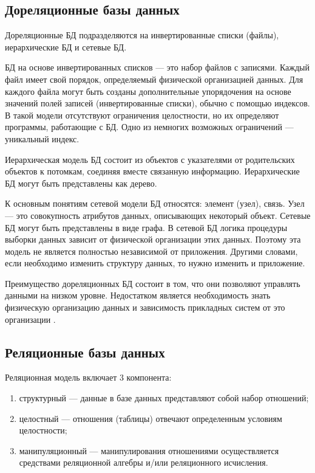 \subsection{Дореляционные базы данных}

Дореляционные БД подразделяются на инвертированные списки (файлы), иерархические БД и сетевые БД.

БД на основе инвертированных списков --- это набор файлов с записями. Каждый файл имеет свой порядок, определяемый физической организацией данных. Для каждого файла могут быть созданы дополнительные упорядочения на основе значений полей записей (инвертированные списки), обычно с помощью индексов. В такой модели отсутствуют ограничения целостности, но их определяют программы, работающие с БД. Одно из немногих возможных ограничений --- уникальный индекс.

Иерархическая модель БД состоит из объектов с указателями от родительских объектов к потомкам, соединяя вместе связанную информацию. Иерархические БД могут быть представлены как дерево. 

К основным понятиям сетевой модели БД относятся: элемент (узел), связь. Узел --- это совокупность атрибутов данных, описывающих некоторый объект. Сетевые БД могут быть представлены в виде графа. В сетевой БД логика процедуры выборки данных зависит от физической организации этих данных. Поэтому эта модель не является полностью независимой от приложения. Другими словами, если необходимо изменить структуру данных, то нужно изменить и приложение. 

Преимущество дореляционных БД состоит в том, что они позволяют управлять данными на низком уровне. Недостатком является необходимость знать физическую организацию данных и зависимость прикладных систем от это организации \cite{info_db_kuznecov}.

\clearpage

\subsection{Реляционные базы данных}

Реляционная модель включает 3 компонента: 

\begin{enumerate}[label={\arabic*)}]
	\item структурный --- данные в базе данных представляют собой набор отношений;
	\item целостный --- отношения (таблицы) отвечают определенным условиям целостности;
	\item манипуляционный --- манипулирования отношениями осуществляется средствами реляционной алгебры и/или реляционного исчисления.
\end{enumerate}


